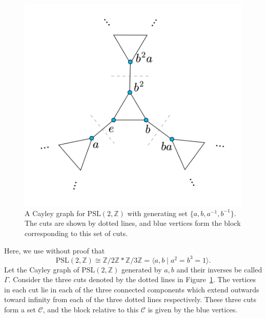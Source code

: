 \begin{figure}[h!]
    \centering
    \includegraphics[width=0.6\linewidth]{sections/talia/CayleyGraph.png}
    \caption{A Cayley graph for \(\mathrm{PSL}(2,\mathbb{Z})\) with generating set \(\{a,b,a^{-1},b^{-1}\}\). The cuts are shown by dotted lines, and blue vertices form the block corresponding to this set of cuts.}
    \label{fig:psl}
\end{figure}

\begin{example}
    
    Here, we use without proof that 
    \[
    \mathrm{PSL}(2,\mathbb{Z}) \cong \mathbb{Z}/2\mathbb{Z} * \mathbb{Z}/3\mathbb{Z} = \langle a,b \mid a^2 = b^3 =1 \rangle.
    \]
    Let the Cayley graph of \(\mathrm{PSL}(2,\mathbb{Z})\) generated by \(a, b\) and their inverses be called \(\Gamma\).
    Consider the three cuts denoted by the dotted lines in Figure~\ref{fig:psl}. The vertices in each cut lie in each of the three connected components which extend outwards toward infinity from each of the three dotted lines respectively. These three cuts form a set \(\mathcal{C}\), and the block relative to this \(\mathcal{C}\) is given by the blue vertices.
\end{example}

